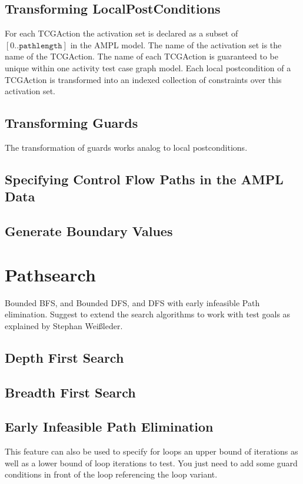 \subsection{Transforming LocalPostConditions}
\label{sec:Postconditions2AMPL}
For each TCGAction the activation set is declared as a subset of $\left[0..\texttt{pathlength}\right]$ in the AMPL model. The name of the activation set is the name of the TCGAction. The name of each TCGAction is guaranteed to be unique within one activity test case graph model. Each local postcondition of a TCGAction is transformed into an indexed collection of constraints over this activation set. 

\subsection{Transforming Guards}
\label{sec:Guards2AMPL}
The transformation of guards works analog to local postconditions.

\subsection{Specifying Control Flow Paths in the AMPL Data}
\subsection{Generate Boundary Values}
\section{Pathsearch}
\label{sec:pathsearch}
Bounded BFS, and Bounded DFS, and DFS with early infeasible Path elimination.
Suggest to extend the search algorithms to work with test goals as explained by Stephan Weißleder.
\subsection{Depth First Search}
\subsection{Breadth First Search}
\subsection{Early Infeasible Path Elimination}
This feature can also be used to specify for loops an upper bound of iterations as well as a lower bound of loop iterations to test. You just need to add some guard conditions in front of the loop referencing the loop variant.

